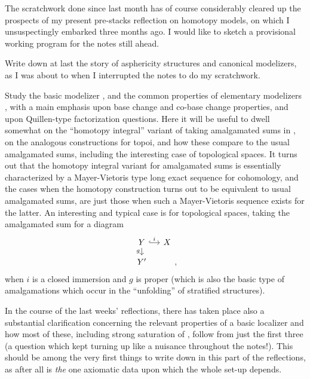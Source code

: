 \bigbreak
\presectionfill{}\par

\label{sec:71}%
The scratchwork done since last month has of course considerably
cleared up the prospects of my present pre-stacks reflection on
homotopy models, on which I unsuspectingly embarked three months
ago. I would like to sketch a provisional working program for the
notes still ahead.

 Write down at last the story of asphericity
structures and canonical modelizers, as I was about to when I
interrupted the notes to do my scratchwork.

 Study the basic modelizer \Cat, and the
common properties of elementary modelizers \Ahat, with a main emphasis
upon base change and co-base change properties, and upon Quillen-type
factorization questions. Here it will be useful to dwell somewhat on
the ``homotopy integral'' variant of taking amalgamated sums in \Cat,
on the analogous constructions for topoi, and how these compare to the
usual amalgamated sums, including the interesting case of topological
spaces. It turns out that the homotopy integral variant
for amalgamated sums is essentially characterized by a Mayer-Vietoris
type long exact sequence for cohomology, and the cases when the
homotopy construction turns out to be equivalent to usual amalgamated
sums, are just those when such a Mayer-Vietoris sequence exists for
the latter. An interesting and typical case is for topological spaces,
taking the amalgamated sum for a diagram
\[\begin{tikzcd}[baseline=(O.base),sep=small]
  Y\ar[r,hook,"i"] \ar[d,swap,"g"] & X \\
  |[alias=O]| Y' &
\end{tikzcd},\]
when $i$ is a closed immersion and $g$ is proper (which is also the
basic type of amalgamations which occur in the ``unfolding'' of
stratified structures).

In the course of the last weeks' reflections, there has taken place
also a substantial clarification concerning the relevant properties of
a basic localizer \scrW{} and how most of these, including strong
saturation of \scrW, follow from just the first three (a question which
kept turning up like a nuisance throughout the notes!). This should be
among the very first things to write down in this part of the
reflections, as \scrW{} after all is \emph{the} one axiomatic data
upon which the whole set-up depends.

